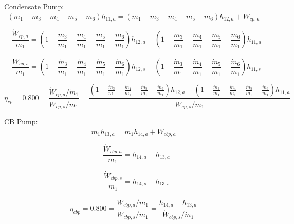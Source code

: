 \documentclass{article}
\begin{document}
Condensate Pump:
\begin{equation}
(\dot{m}_{ 1} - \dot{m}_{ 3} - \dot{m}_{ 4} - \dot{m}_{ 5} - \dot{m}_{ 6})h_{11,a} = (\dot{m}_{ 1} - \dot{m}_{ 3} - \dot{m}_{ 4} - \dot{m}_{ 5} - \dot{m}_{ 6})h_{12,a} + \dot{W}_{cp ,a}
\end{equation}

\begin{equation}
-\frac{\dot{W}_{cp ,a}}{m_1} = (1 - \frac{\dot{m}_{ 3}}{\dot{m}_{ 1}} - \frac{\dot{m}_{ 4}}{\dot{m}_{ 1}} - \frac{\dot{m}_{ 5}}{\dot{m}_{ 1}} - \frac{\dot{m}_{ 6}}{\dot{m}_{ 1}})h_{12,a} - (1 - \frac{\dot{m}_{ 3}}{\dot{m}_{ 1}} - \frac{\dot{m}_{ 4}}{\dot{m}_{ 1}} - \frac{\dot{m}_{ 5}}{\dot{m}_{ 1}} - \frac{\dot{m}_{ 6}}{\dot{m}_{ 1}})h_{11,a}\end{equation}

\begin{equation}
-\frac{\dot{W}_{cp ,s}}{m_1} = (1 - \frac{\dot{m}_{ 3}}{\dot{m}_{ 1}} - \frac{\dot{m}_{ 4}}{\dot{m}_{ 1}} - \frac{\dot{m}_{ 5}}{\dot{m}_{ 1}} - \frac{\dot{m}_{ 6}}{\dot{m}_{ 1}})h_{12,s} - (1 - \frac{\dot{m}_{ 3}}{\dot{m}_{ 1}} - \frac{\dot{m}_{ 4}}{\dot{m}_{ 1}} - \frac{\dot{m}_{ 5}}{\dot{m}_{ 1}} - \frac{\dot{m}_{ 6}}{\dot{m}_{ 1}})h_{11,s}\end{equation}

\begin{equation}
\eta_{cp } =    0.800 = \frac{\dot{W}_{cp ,a} / \dot{m}_{1}}{\dot{W}_{cp ,s} / \dot{m}_{1}} = \frac{
(1 - \frac{\dot{m}_{ 3}}{\dot{m}_{ 1}} - \frac{\dot{m}_{ 4}}{\dot{m}_{ 1}} - \frac{\dot{m}_{ 5}}{\dot{m}_{ 1}} - \frac{\dot{m}_{ 6}}{\dot{m}_{ 1}})h_{12,a} - (1 - \frac{\dot{m}_{ 3}}{\dot{m}_{ 1}} - \frac{\dot{m}_{ 4}}{\dot{m}_{ 1}} - \frac{\dot{m}_{ 5}}{\dot{m}_{ 1}} - \frac{\dot{m}_{ 6}}{\dot{m}_{ 1}})h_{11,a}}{\dot{W}_{cp ,s} / \dot{m}_{1}}
\end{equation}


CB Pump:
\begin{equation}
\dot{m}_{ 1}h_{13,a} = \dot{m}_{ 1}h_{14,a} + \dot{W}_{cbp,a}
\end{equation}

\begin{equation}
-\frac{\dot{W}_{cbp,a}}{m_1} = h_{14,a} - h_{13,a}\end{equation}

\begin{equation}
-\frac{\dot{W}_{cbp,s}}{m_1} = h_{14,s} - h_{13,s}\end{equation}

\begin{equation}
\eta_{cbp} =    0.800 = \frac{\dot{W}_{cbp,a} / \dot{m}_{1}}{\dot{W}_{cbp,s} / \dot{m}_{1}} = \frac{
h_{14,a} - h_{13,a}}{\dot{W}_{cbp,s} / \dot{m}_{1}}
\end{equation}
\end{document}
